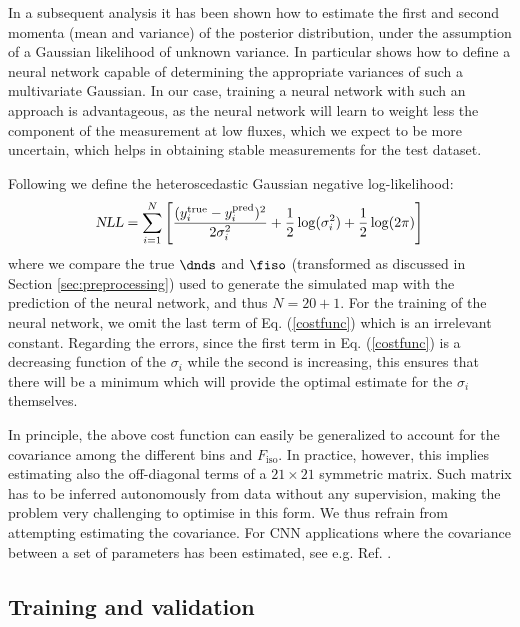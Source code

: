 In a subsequent analysis \cite{heteroscedastic-error} it has been shown how to estimate the first and second momenta (mean and variance) of the posterior distribution, under the assumption of a Gaussian likelihood of unknown variance. In particular \cite{heteroscedastic-error} shows how to define a neural network capable of determining the appropriate variances of such a multivariate Gaussian.
In our case, training a neural network with such an approach is advantageous, as the neural network will learn to weight less the component of the measurement at low fluxes, which we expect to be more uncertain, which helps in obtaining stable measurements for the test dataset. 

Following \cite{heteroscedastic-error} we define the heteroscedastic Gaussian negative log-likelihood:
\begin{equation}
    \textsl{NLL} = \sum_{i=1}^N  \left[\frac{(y_i^\textrm{true}-y_i^\textrm{pred})^2}{2\sigma_i^2} + \frac{1}{2} \log(\sigma_i^2)  +  \frac{1}{2} \log(2\pi)  \right]
\label{costfunc}    
\end{equation}
where we compare the true $\dnds$ and $\fiso$ (transformed as discussed in Section \ref{sec:preprocessing}) used to generate the simulated map with the prediction of the neural network, and thus $N=20+1$.
For the training of the neural network, we omit the last term of Eq. (\ref{costfunc}) which is an irrelevant constant.
%
Regarding the errors, since the first term in Eq. (\ref{costfunc}) is a decreasing function of the $\sigma_i$ while the second is increasing, this ensures that there will be a minimum which will provide the  optimal estimate for the $\sigma_i$ themselves.

In principle, the above cost function can easily be generalized to account for the covariance among the different bins and $F_\textrm{iso}$. 
 In practice, however, this implies estimating also the off-diagonal terms of a $21 \times 21$ symmetric matrix. Such matrix has to be inferred autonomously from data without any supervision, making the problem very challenging to optimise in this form. We thus refrain from attempting estimating the covariance. For CNN applications where the covariance between a set of parameters has been estimated, see e.g. Ref. \cite{Mishra-Sharma:2021oxe, List:2020mzd}.








\subsection{Training and validation}
\label{sec:NN-training}

